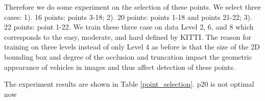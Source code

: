 Therefore we do some experiment on the selection of these points. We select three cases: 1). 16 points: points 3-18; 2). 20 points: points 1-18 and points 21-22; 3). 22 points: point 1-22. We train these three case on data Level 2, 6, and 8 which corresponds to the easy, moderate, and hard defined by KITTI. The reason for training on three levels instead of only Level 4 as before is that the size of the 2D bounding box and degree of the occlusion and truncation impact the geometric appearance of vehicles in images and thus affect detection of these points.

The experiment results are shown in Table \ref{point_selection}. \tbd p20 is not optimal now

\begin{table}[]
	\centering
	\caption{The performance of six tasks with different data difficulty level and different point selection cases.}
	\label{point_selection}
\end{table}
